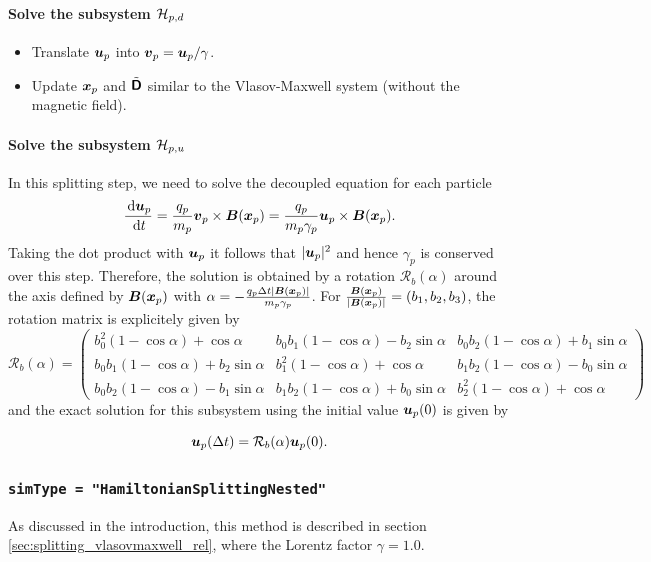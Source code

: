 \documentclass[11pt]{article}
\begin{document}
\paragraph{Solve the subsystem $\mathcal{H}_{p,d}$}
    \begin{itemize}
        \item{Translate ${\boldsymbol u}_p$ into ${\boldsymbol v}_p = {\boldsymbol u}_p/\gamma$.}
        \item{Update ${\boldsymbol x}_{p}$ and  $\tilde{{\boldsymbol {\rm \mathsf{D}}}}$ similar to the Vlasov-Maxwell system (without the magnetic field).}
    \end{itemize}

\paragraph{Solve the subsystem $\mathcal{H}_{p,u}$}   
 In this splitting step, we need to solve the decoupled equation for each particle
 $$
\frac{\, {\rm d} {\boldsymbol u}_p}{\, {\rm d} t} = \frac{q_p}{m_p} {\boldsymbol v}_p \times {\boldsymbol B}({\boldsymbol x}_p) = \frac{q_p}{m_p \gamma_p} {\boldsymbol u}_p \times {\boldsymbol B}({\boldsymbol x}_p).
 $$
 Taking the dot product with ${\boldsymbol u}_p$ it follows that $|{\boldsymbol u}_p|^2$ and hence $\gamma_p$ is conserved over this step. 
 Therefore, the solution is obtained by a rotation $\mathcal{R}_b(\alpha)$ around the axis defined by ${\boldsymbol B}({\boldsymbol x}_p)$ with $\alpha = -\frac{q_p \Delta t |{\boldsymbol B}({\boldsymbol x}_p)|}{m_p \gamma_p}$.
 For $\frac{{\boldsymbol B}({\boldsymbol x}_p)}{|{\boldsymbol B}({\boldsymbol x}_p)|} = (b_1, b_2, b_3)$, the rotation matrix is explicitely given by
 $$
 \mathcal{R}_b(\alpha) = 
    \begin{pmatrix}
        b_0^2 (1- \cos \alpha) + \cos \alpha & b_0 b_1 (1- \cos \alpha ) - b_2 \sin \alpha & b_0 b_2 (1-\cos \alpha) + b_1 \sin \alpha \\
        b_0 b_1 (1- \cos \alpha) + b_2 \sin \alpha & b_1^2 (1-\cos \alpha) + \cos \alpha & b_1 b_2 (1-\cos \alpha) - b_0 \sin \alpha\\
        b_0 b_2 (1-\cos \alpha) - b_1 \sin \alpha & b_1 b_2 (1-\cos \alpha) + b_0 \sin \alpha & b_2^2 (1-\cos \alpha) + \cos \alpha
    \end{pmatrix}    
 $$
and the exact solution for this subsystem using the initial value ${\boldsymbol u}_p (0)$ is given by

$$
{\boldsymbol u}_p (\Delta t) = \mathcal{R}_b(\alpha) {\boldsymbol u}_p (0).
$$
\subsubsection{\verb|simType = "HamiltonianSplittingNested"|}
As discussed in the introduction, this method is described in section \ref{sec:splitting_vlasovmaxwell_rel}, where the Lorentz factor $\gamma = 1.0$.
\end{document}
